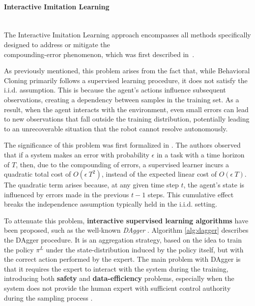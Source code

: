 \paragraph*{Interactive Imitation Learning}\mbox{}\\
The Interactive Imitation Learning approach encompasses all methods specifically designed to address or mitigate the \\ compounding-error phenomenon, which was first described in~\cite{pomerleau1988alvinn}.

As previously mentioned, this problem arises from the fact that, while Behavioral Cloning primarily follows a supervised learning procedure, it does not satisfy the i.i.d. assumption. This is because the agent's actions influence subsequent observations, creating a dependency between samples in the training set. As a result, when the agent interacts with the environment, even small errors can lead to new observations that fall outside the training distribution, potentially leading to an unrecoverable situation that the robot cannot resolve autonomously.

The significance of this problem was first formalized in \cite{ross2010efficient_reductions}. The authors observed that if a system makes an error with probability $\epsilon$ in a task with a time horizon of $T$, then, due to the compounding of errors, a supervised learner incurs a quadratic total cost of $O(\epsilon \ T^{2})$, instead of the expected linear cost of $O(\epsilon \ T)$. The quadratic term arises because, at any given time step $t$, the agent's state is influenced by errors made in the previous $t-1$ steps. This cumulative effect breaks the independence assumption typically held in the i.i.d. setting.

To attenuate this problem, \textbf{interactive supervised learning algorithms} have been proposed, such as the well-known \textit{DAgger} \cite{ross2011dagger}. Algorithm \ref{alg:dagger} describes the DAgger procedure. It is an aggregation strategy, based on the idea to train the policy $\pi^{L}$ under the state-distribution induced by the policy itself, but with the correct action performed by the expert. The main problem with DAgger is that it requires the expert to interact with the system during the training, introducing both \textbf{safety} and \textbf{data-efficiency} problems, especially when the system does not provide the human expert with sufficient control authority during the sampling process \cite{laskey2017comparing_hc_rc}. 


